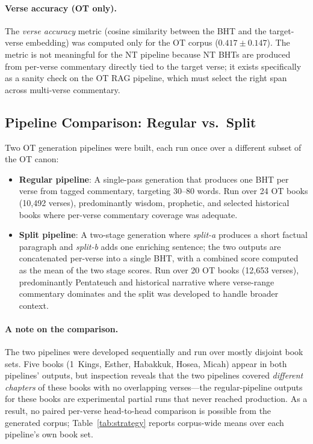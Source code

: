\paragraph{Verse accuracy (OT only).}
\label{sec:verse-acc}
The \emph{verse accuracy} metric (cosine similarity between the BHT and the target-verse embedding) was computed only for the OT corpus ($0.417 \pm 0.147$). The metric is not meaningful for the NT pipeline because NT BHTs are produced from per-verse commentary directly tied to the target verse; it exists specifically as a sanity check on the OT RAG pipeline, which must select the right span across multi-verse commentary.

\subsection{Pipeline Comparison: Regular vs.\ Split}
\label{sec:strategy}

Two OT generation pipelines were built, each run once over a different subset of the OT canon:

\begin{itemize}[nosep,leftmargin=*]
    \item \textbf{Regular pipeline}: A single-pass generation that produces one BHT per verse from tagged commentary, targeting 30--80 words. Run over 24 OT books (10{,}492 verses), predominantly wisdom, prophetic, and selected historical books where per-verse commentary coverage was adequate.
    \item \textbf{Split pipeline}: A two-stage generation where \emph{split-a} produces a short factual paragraph and \emph{split-b} adds one enriching sentence; the two outputs are concatenated per-verse into a single BHT, with a combined score computed as the mean of the two stage scores. Run over 20 OT books (12{,}653 verses), predominantly Pentateuch and historical narrative where verse-range commentary dominates and the split was developed to handle broader context.
\end{itemize}

\paragraph{A note on the comparison.} The two pipelines were developed sequentially and run over mostly disjoint book sets. Five books (1~Kings, Esther, Habakkuk, Hosea, Micah) appear in both pipelines' outputs, but inspection reveals that the two pipelines covered \emph{different chapters} of these books with no overlapping verses---the regular-pipeline outputs for these books are experimental partial runs that never reached production. As a result, no paired per-verse head-to-head comparison is possible from the generated corpus; Table~\ref{tab:strategy} reports corpus-wide means over each pipeline's own book set.

